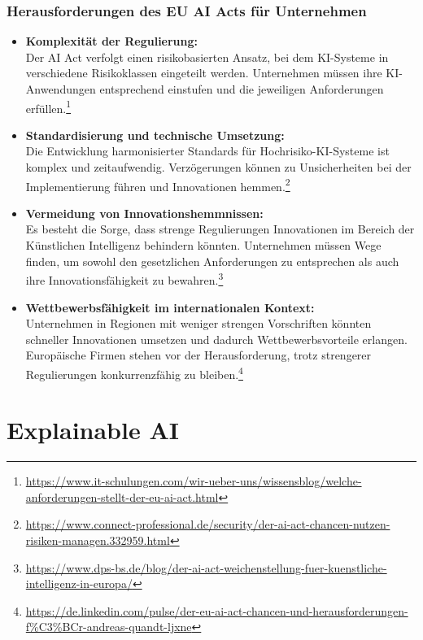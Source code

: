 \documentclass[aspectratio=1610, xcolor=dvipsnames, 9pt]{beamer}
\begin{document}
\begin{frame}
    \frametitle{Herausforderungen des EU AI Acts für Unternehmen}

    \begin{itemize}
        \item \textbf{Komplexität der Regulierung:} \\
        Der AI Act verfolgt einen risikobasierten Ansatz, bei dem KI-Systeme in verschiedene Risikoklassen eingeteilt werden. Unternehmen müssen ihre KI-Anwendungen entsprechend einstufen und die jeweiligen Anforderungen erfüllen.\footnote{\url{https://www.it-schulungen.com/wir-ueber-uns/wissensblog/welche-anforderungen-stellt-der-eu-ai-act.html}}

        \item \textbf{Standardisierung und technische Umsetzung:} \\
        Die Entwicklung harmonisierter Standards für Hochrisiko-KI-Systeme ist komplex und zeitaufwendig. Verzögerungen können zu Unsicherheiten bei der Implementierung führen und Innovationen hemmen.\footnote{\url{https://www.connect-professional.de/security/der-ai-act-chancen-nutzen-risiken-managen.332959.html}}

        \item \textbf{Vermeidung von Innovationshemmnissen:} \\
        Es besteht die Sorge, dass strenge Regulierungen Innovationen im Bereich der Künstlichen Intelligenz behindern könnten. Unternehmen müssen Wege finden, um sowohl den gesetzlichen Anforderungen zu entsprechen als auch ihre Innovationsfähigkeit zu bewahren.\footnote{\url{https://www.dps-bs.de/blog/der-ai-act-weichenstellung-fuer-kuenstliche-intelligenz-in-europa/}}

        \item \textbf{Wettbewerbsfähigkeit im internationalen Kontext:} \\
        Unternehmen in Regionen mit weniger strengen Vorschriften könnten schneller Innovationen umsetzen und dadurch Wettbewerbsvorteile erlangen. Europäische Firmen stehen vor der Herausforderung, trotz strengerer Regulierungen konkurrenzfähig zu bleiben.\footnote{\url{https://de.linkedin.com/pulse/der-eu-ai-act-chancen-und-herausforderungen-f\%C3\%BCr-andreas-quandt-ljxne}}
    \end{itemize}

\end{frame}


\section{Explainable AI}
\end{document}
